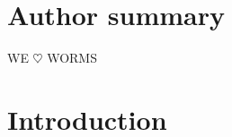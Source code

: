 \documentclass[10pt,letterpaper]{article}
\begin{document}



\section*{Author summary}
WE $\heartsuit$ WORMS

\linenumbers

\section*{Introduction}
\end{document}
